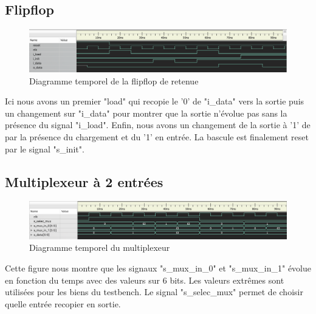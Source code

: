 \documentclass{article}
\begin{document}
    \subsection{Flipflop}
    \begin{figure}[h]
        \centering
        \includegraphics[width=\textwidth]{../doc/tb_screen/flipflop.png}
        \caption{Diagramme temporel de la flipflop de retenue}
        \label{fig:diag_tb_flipflop}
    \end{figure}
    \par Ici nous avons un premier "load" qui recopie le '0' de "i\_data" vers la sortie puis un changement sur "i\_data" pour montrer que la sortie n'évolue pas sans la présence du signal "i\_load". Enfin, nous avons un changement de la sortie à '1' de par la présence du chargement et du '1' en entrée. La bascule est finalement reset par le signal "s\_init".

    \subsection{Multiplexeur à 2 entrées}
    \begin{figure}[h]
        \centering
        \includegraphics[width=\textwidth]{../doc/tb_screen/mux_2_in.png}
        \caption{Diagramme temporel du multiplexeur}
        \label{fig:diag_tb_mux_2_in}
    \end{figure}
    \par Cette figure nous montre que les signaux "s\_mux\_in\_0" et "s\_mux\_in\_1" évolue en fonction du temps avec des valeurs sur 6 bits. Les valeurs extrêmes sont utilisées pour les biens du testbench. Le signal "s\_selec\_mux" permet de choisir quelle entrée recopier en sortie.
\end{document}
